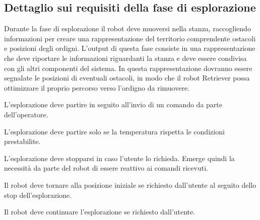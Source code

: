 \subsection{Dettaglio sui requisiti della fase di esplorazione}

\begin{description}[itemsep=1em]
  \item[\requirementref{R-explore}]

  Durante la fase di esplorazione il robot deve muoversi nella stanza, raccogliendo informazioni per creare una rappresentazione del territorio comprendente ostacoli e posizioni degli ordigni.
  L'output di questa fase consiste in una rappresentazione che deve riportare le informazioni riguardanti la stanza e deve essere condivisa con gli altri componenti del sistema.
  In questa rappresentazione dovranno essere segnalate le posizioni di eventuali ostacoli, in modo che il robot Retriever possa ottimizzare il proprio percorso verso l'ordigno da rimuovere.

  \item[\requirementref{R-startExplore}]

  L'esplorazione deve partire in seguito all'invio di un comando da parte dell'operatore.

  \item[\requirementref{R-TempOk}]

  L'esplorazione deve partire solo se la temperatura rispetta le condizioni prestabilite.

  \item[\requirementref{R-stopExplore}]

  L'esplorazione deve stopparsi in caso l'utente lo richieda.
  Emerge quindi la necessità da parte del robot di essere reattivo ai comandi ricevuti.

  \item[\requirementref{R-backHome}]

  Il robot deve tornare alla posizione iniziale se richiesto dall'utente al seguito dello stop dell'esplorazione.

  \item[\requirementref{R-continueExplore}]

  Il robot deve continuare l'esplorazione se richiesto dall'utente.

  \item[\requirementref{R-blinkLed}]


\end{description}
